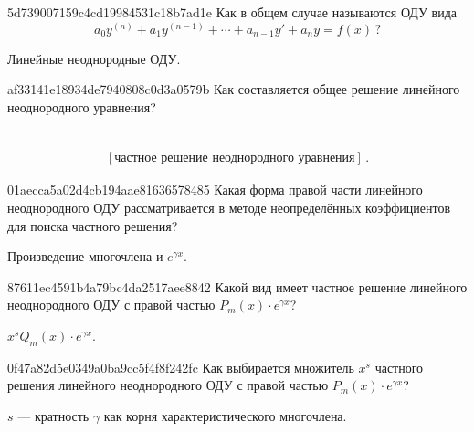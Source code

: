 \begin{note}{5d739007159c4cd19984531c18b7ad1e}
    Как в общем случае называются ОДУ вида
    \[
        a_0 y^{(n)} + a_1y^{(n-1)} + \cdots + a_{n-1}y' + a_n y = f(x)\,?
    \]

    \begin{cloze}{1}
        Линейные неоднородные ОДУ.
    \end{cloze}
\end{note}

\begin{note}{af33141e18934de7940808c0d3a0579b}
    Как составляется общее решение линейного неоднородного уравнения?

    \begin{cloze}{1}
        \begin{multline*}
            [\text{общее решение однородного уравнения}] \\
            + \\
            [\text{частное решение неоднородного уравнения}]\,.
        \end{multline*}
    \end{cloze}
\end{note}

\begin{note}{01aecca5a02d4cb194aae81636578485}
    Какая форма правой части линейного неоднородного ОДУ рассматривается в методе неопределённых коэффициентов для поиска частного решения?

    \begin{cloze}{1}
        Произведение многочлена и \({ e^{\gamma x} }\).
    \end{cloze}
\end{note}

\begin{note}{87611ec4591b4a79bc4da2517aee8842}
    Какой вид имеет частное решение линейного неоднородного ОДУ с правой частью \({ P_m(x) \cdot e^{\gamma x} }\)?

    \begin{cloze}{1}
        \({ x^{s} Q_m(x) \cdot e^{\gamma x} }\).
    \end{cloze}
\end{note}

\begin{note}{0f47a82d5e0349a0ba9cc5f4f8f242fc}
    Как выбирается множитель \({ x^{s} }\) частного решения линейного неоднородного ОДУ с правой частью \({ P_m(x) \cdot e^{\gamma x} }\)?

    \begin{cloze}{1}
        \({ s }\) --- кратность \({ \gamma }\) как корня характеристического многочлена.
    \end{cloze}
\end{note}

